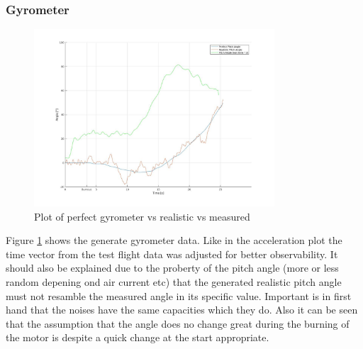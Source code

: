\subsubsection{Gyrometer}
\begin{figure}[h!]
 \centering
 \includegraphics[width=0.8\textwidth]{./Pictures/PitchPerfVSReal.jpg}
 \caption{Plot of perfect gyrometer vs realistic vs measured}
 \label{fig:PtichPerVSReal}
\end{figure}
Figure \ref{fig:PtichPerVSReal} shows the generate gyrometer data.
Like in the acceleration plot the time vector from the test flight data was adjusted for better observability.
It should also be explained due to the proberty of the pitch angle (more or less random depening ond air current etc) that the generated realistic pitch angle must not resamble the measured angle in its specific value.
Important is in first hand that the noises have the same capacities which they do.
Also it can be seen that the assumption that the angle does no change great during the burning of the motor is despite a quick change at the start appropriate.

\newpage

